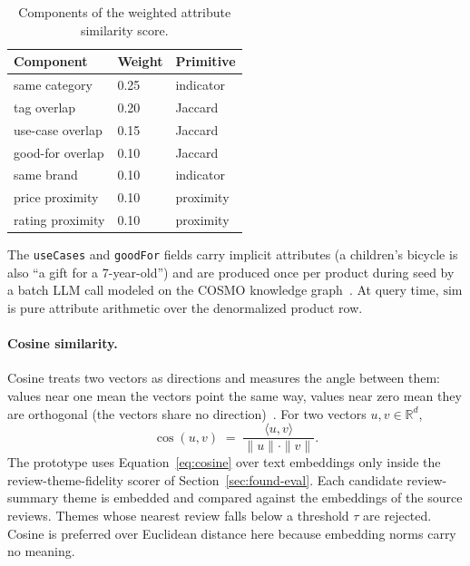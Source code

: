 \begin{table}[ht]
  \centering
  \footnotesize
  \begin{tabular}{lll}
    \toprule
    Component & Weight & Primitive \\
    \midrule
    same category   & 0.25 & indicator \\
    tag overlap     & 0.20 & Jaccard \\
    use-case overlap & 0.15 & Jaccard \\
    good-for overlap & 0.10 & Jaccard \\
    same brand      & 0.10 & indicator \\
    price proximity & 0.10 & proximity \\
    rating proximity & 0.10 & proximity \\
    \bottomrule
  \end{tabular}
  \caption{Components of the weighted attribute similarity
  score.}
  \label{tab:found-sim-weights}
\end{table}

The \texttt{useCases} and \texttt{goodFor} fields carry implicit
attributes (a children's bicycle is also ``a gift for a
7-year-old'') and are produced once per product during seed by a
batch LLM call modeled on the COSMO knowledge graph~\cite{COSMO}.
At query time, $\mathrm{sim}$ is pure attribute arithmetic over
the denormalized product row.

\paragraph{Cosine similarity.} Cosine treats two vectors as
directions and measures the angle between them: values near
one mean the vectors point the same way, values near zero mean
they are orthogonal (the vectors share no
direction)~\cite{ManningIR2008}. For two vectors
$u, v \in \mathbb{R}^d$,
\begin{equation}
  \cos(u, v) \;=\; \frac{\langle u, v \rangle}{\|u\| \cdot \|v\|}.
  \label{eq:cosine}
\end{equation}
The prototype uses Equation~\ref{eq:cosine} over text embeddings
only inside the
review-theme-fidelity scorer of Section~\ref{sec:found-eval}.
Each candidate review-summary theme is embedded and compared
against the embeddings of the source reviews. Themes whose
nearest review falls below a threshold $\tau$ are rejected.
Cosine is preferred over Euclidean distance here because
embedding norms carry no meaning.

